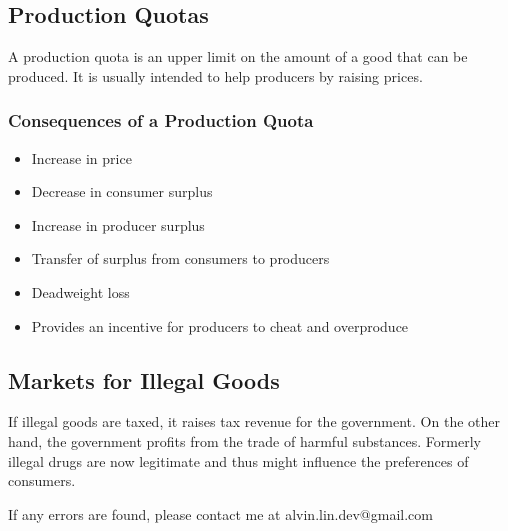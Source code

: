 \documentclass[letterpaper, 12pt]{article}
\begin{document}
\subsection{Production Quotas}
A production quota is an upper limit on the amount of a good that can be
produced. It is usually intended to help producers by raising prices.

\subsubsection{Consequences of a Production Quota}
\begin{itemize}
  \item Increase in price
  \item Decrease in consumer surplus
  \item Increase in producer surplus
  \item Transfer of surplus from consumers to producers
  \item Deadweight loss
  \item Provides an incentive for producers to cheat and overproduce
\end{itemize}

\subsection{Markets for Illegal Goods}
If illegal goods are taxed, it raises tax revenue for the government. On the
other hand, the government profits from the trade of harmful substances.
Formerly illegal drugs are now legitimate and thus might influence the
preferences of consumers.

\begin{center}
  If any errors are found, please contact me at alvin.lin.dev@gmail.com
\end{center}
\end{document}
